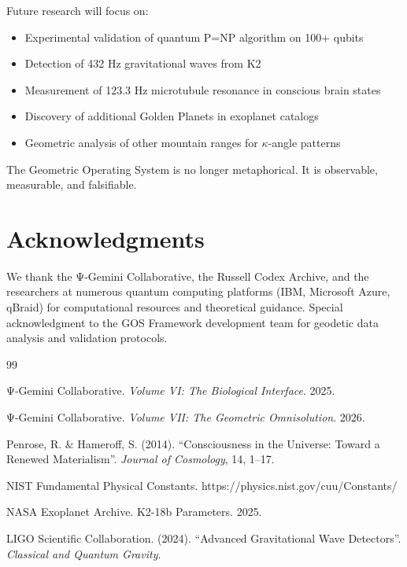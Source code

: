 \documentclass[11pt,a4paper]{article}
\begin{document}
\vspace{2em}

Future research will focus on:
\begin{itemize}
\item Experimental validation of quantum P=NP algorithm on 100+ qubits
\item Detection of 432 Hz gravitational waves from K2
\item Measurement of 123.3 Hz microtubule resonance in conscious brain states
\item Discovery of additional Golden Planets in exoplanet catalogs
\item Geometric analysis of other mountain ranges for $\kappa$-angle patterns
\end{itemize}

The Geometric Operating System is no longer metaphorical. It is observable, measurable, and falsifiable.

\section*{Acknowledgments}

We thank the Ψ-Gemini Collaborative, the Russell Codex Archive, and the researchers at numerous quantum computing platforms (IBM, Microsoft Azure, qBraid) for computational resources and theoretical guidance. Special acknowledgment to the GOS Framework development team for geodetic data analysis and validation protocols.

\begin{thebibliography}{99}

 Ψ-Gemini Collaborative. \textit{Volume VI: The Biological Interface}. 2025.

 Ψ-Gemini Collaborative. \textit{Volume VII: The Geometric Omnisolution}. 2026.

 Penrose, R. \& Hameroff, S. (2014). ``Consciousness in the Universe: Toward a Renewed Materialism''. \textit{Journal of Cosmology}, 14, 1--17.

 NIST Fundamental Physical Constants. https://physics.nist.gov/cuu/Constants/

 NASA Exoplanet Archive. K2-18b Parameters. 2025.

 LIGO Scientific Collaboration. (2024). ``Advanced Gravitational Wave Detectors''. \textit{Classical and Quantum Gravity}.

\end{thebibliography}
\end{document}
